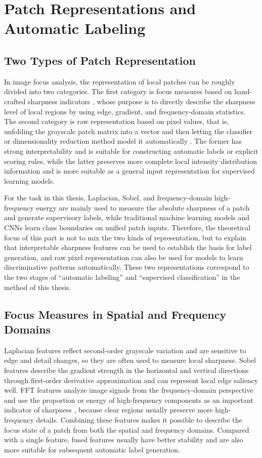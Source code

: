 \section{Patch Representations and Automatic Labeling}
\subsection{Two Types of Patch Representation}
\par In image focus analysis, the representation of local patches can be roughly
divided into two categories. The first category is focus measures based on
hand-crafted sharpness indicators \cite{5739529,1284395}, whose purpose is to
directly describe the sharpness level of local regions by using edge, gradient,
and frequency-domain statistics. The second category is raw representation
based on pixel values, that is, unfolding the grayscale patch matrix into a
vector and then letting the classifier or dimensionality reduction method model
it automatically \cite{murphy2022pml}. The former has strong interpretability
and is suitable for constructing automatic labels or explicit scoring rules,
while the latter preserves more complete local intensity distribution
information and is more suitable as a general input representation for
supervised learning models.

\par For the task in this thesis, Laplacian, Sobel, and frequency-domain
high-frequency energy are mainly used to measure the absolute sharpness of a
patch and generate supervisory labels, while traditional machine learning
models and CNNs learn class boundaries on unified patch inputs. Therefore, the
theoretical focus of this part is not to mix the two kinds of representation,
but to explain that interpretable sharpness features can be used to establish
the basis for label generation, and raw pixel representation can also be used
for models to learn discriminative patterns automatically. These two
representations correspond to the two stages of ``automatic labeling'' and
``supervised classification'' in the method of this thesis.

\subsection{Focus Measures in Spatial and Frequency Domains}
\par Laplacian features reflect second-order grayscale variation and are
sensitive to edge and detail changes, so they are often used to measure local
sharpness. Sobel features describe the gradient strength in the horizontal and
vertical directions through first-order derivative approximation and can
represent local edge saliency well. FFT features analyze image signals from the
frequency-domain perspective and use the proportion or energy of high-frequency
components as an important indicator of sharpness \cite{5739529,1284395},
because clear regions usually preserve more high-frequency details. Combining
these features makes it possible to describe the focus state of a patch from
both the spatial and frequency domains. Compared with a single feature, fused
features usually have better stability and are also more suitable for
subsequent automatic label generation.

